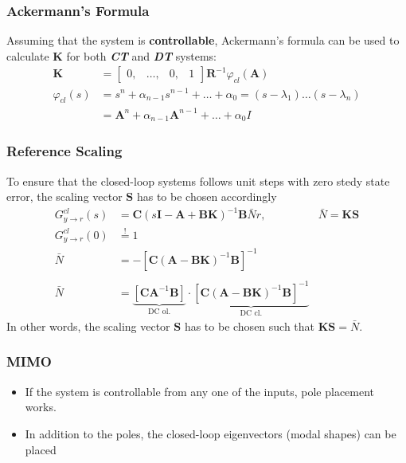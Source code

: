 \subsubsection{Ackermann's Formula}
Assuming that the system is \textbf{controllable}, Ackermann's formula can be used to calculate $\mathbf{K}$ for both \textbf{\textit{CT}} and \textbf{\textit{DT}} systems:
\noindent\begin{align*}
    \mathbf{K}      & =\begin{bmatrix}
                           0, & \ldots, & 0, & 1
                       \end{bmatrix}
    \mathbf{R}^{-1}\varphi_{cl}(\mathbf{A})                                                     \\
    \varphi_{cl}(s) & =s^n+\alpha_{n-1}s^{n-1}+\ldots+\alpha_0=(s-\lambda_1)\ldots(s-\lambda_n) \\
                    & =\mathbf{A}^n+\alpha_{n-1}\mathbf{A}^{n-1}+\ldots+\alpha_0 I
\end{align*}

\subsubsection{Reference Scaling}
To ensure that the closed-loop systems follows unit steps with zero stedy state error, the scaling vector $\mathbf{S}$ has to be chosen accordingly
\noindent\begin{align*}
    G_{y\rightarrow r}^{cl}(s) & =\mathbf{C}{(s\mathbf{I}-\mathbf{A}+\mathbf{BK})}^{-1}\mathbf{B}\bar{N}r, & \bar{N}=\mathbf{KS} \\
    G_{y\rightarrow r}^{cl}(0) & \overset{!}{=} 1                                                                                \\
    \bar{N}                    & =-{\left[\mathbf{C}{(\mathbf{A}-\mathbf{BK})}^{-1}\mathbf{B}\right]}^{-1}\\\\
    \bar{N}                    & =\underbrace{\left[\mathbf{CA}^{-1}\mathbf{B}\right]}_{\text{DC ol.}}\cdot\underbrace{{\left[\mathbf{C}{(\mathbf{A}-\mathbf{BK})}^{-1}\mathbf{B}\right]}^{-1}}_{\text{DC cl.}}
\end{align*}
In other words, the scaling vector $\mathbf{S}$ has to be chosen such that $\mathbf{KS}=\bar{N}$.

\subsubsection{MIMO}
\begin{itemize}
    \item If the system is controllable from any one of the inputs, pole placement works.
    \item In addition to the poles, the closed-loop eigenvectors (modal shapes) can be placed
\end{itemize}